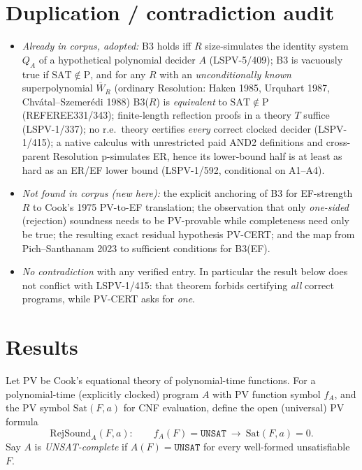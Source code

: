 \documentclass[11pt]{article}
\theoremstyle{remark}
\newcommand{\SAT}{\mathrm{SAT}}
\newcommand{\PV}{\mathrm{PV}}
\newcommand{\Wb}{\overline{W}}
\newcommand{\RejSound}{\mathrm{RejSound}}
\begin{document}
\section{Duplication / contradiction audit}
\begin{itemize}
\item \emph{Already in corpus, adopted:} B3 holds iff $R$ size-simulates the identity system $Q_A$ of a
 hypothetical polynomial decider $A$ (LSPV-5/409); B3 is vacuously true if $\SAT\notin\mathrm P$, and
 for any $R$ with an \emph{unconditionally known} superpolynomial $\Wb_R$ (ordinary Resolution:
 Haken 1985, Urquhart 1987, Chv\'atal--Szemer\'edi 1988) B3($R$) is \emph{equivalent} to
 $\SAT\notin\mathrm P$ (REFEREE331/343); finite-length reflection proofs in a theory $T$ suffice
 (LSPV-1/337); no r.e.\ theory certifies \emph{every} correct clocked decider (LSPV-1/415); a native
 calculus with unrestricted paid AND2 definitions and cross-parent Resolution p-simulates ER, hence its
 lower-bound half is at least as hard as an ER/EF lower bound (LSPV-1/592, conditional on A1--A4).
\item \emph{Not found in corpus (new here):} the explicit anchoring of B3 for EF-strength $R$ to
 Cook's 1975 PV-to-EF translation; the observation that only \emph{one-sided} (rejection) soundness
 needs to be PV-provable while completeness need only be true; the resulting exact residual
 hypothesis PV-CERT; and the map from Pich--Santhanam 2023 to sufficient conditions for B3(EF).
\item \emph{No contradiction} with any verified entry. In particular the result below does not
 conflict with LSPV-1/415: that theorem forbids certifying \emph{all} correct programs, while
 PV-CERT asks for \emph{one}.
\end{itemize}

\section{Results}

Let $\PV$ be Cook's equational theory of polynomial-time functions. For a polynomial-time
(explicitly clocked) program $A$ with $\PV$ function symbol $f_A$, and the $\PV$ symbol
$\mathrm{Sat}(F,a)$ for CNF evaluation, define the open (universal) $\PV$ formula
\[
 \RejSound_A(F,a):\qquad f_A(F)=\mathtt{UNSAT}\ \rightarrow\ \mathrm{Sat}(F,a)=0 .
\]
Say $A$ is \emph{UNSAT-complete} if $A(F)=\mathtt{UNSAT}$ for every well-formed unsatisfiable $F$.
\end{document}
